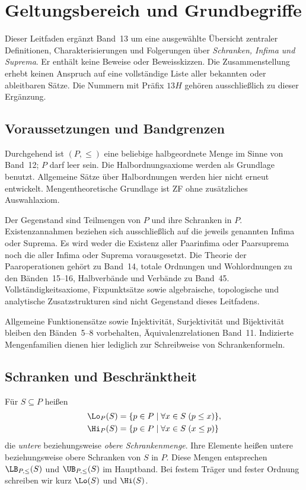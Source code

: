 \chapter{Geltungsbereich und Grundbegriffe}
\label{b13guide:ch:foundations}

Dieser Leitfaden ergänzt Band~13 um eine ausgewählte Übersicht
zentraler Definitionen, Charakterisierungen und Folgerungen über
\emph{Schranken, Infima und Suprema}. Er enthält keine Beweise
oder Beweisskizzen. Die Zusammenstellung erhebt keinen Anspruch
auf eine vollständige Liste aller bekannten oder ableitbaren Sätze.
Die Nummern mit Präfix $13H$ gehören ausschließlich zu dieser Ergänzung.

\section{Voraussetzungen und Bandgrenzen}

Durchgehend ist $(P,\leq)$ eine beliebige halbgeordnete Menge
im Sinne von Band~12; $P$ darf leer sein. Die Halbordnungsaxiome
werden als Grundlage benutzt. Allgemeine Sätze über Halbordnungen
werden hier nicht erneut entwickelt. Mengentheoretische Grundlage
ist ZF ohne zusätzliches Auswahlaxiom.

Der Gegenstand sind Teilmengen von $P$ und ihre Schranken in $P$.
Existenzannahmen beziehen sich ausschließlich auf die jeweils
genannten Infima oder Suprema. Es wird weder die Existenz aller
Paarinfima oder Paarsuprema noch die aller Infima oder Suprema
vorausgesetzt. Die Theorie der Paaroperationen gehört zu Band~14,
totale Ordnungen und Wohlordnungen zu den Bänden~15--16,
Halbverbände und Verbände zu Band~45. Vollständigkeitsaxiome,
Fixpunktsätze sowie algebraische, topologische und analytische
Zusatzstrukturen sind nicht Gegenstand dieses Leitfadens.

Allgemeine Funktionensätze sowie Injektivität, Surjektivität
und Bijektivität bleiben den Bänden~5--8 vorbehalten,
Äquivalenzrelationen Band~11. Indizierte Mengenfamilien dienen
hier lediglich zur Schreibweise von Schrankenformeln.

\section{Schranken und Beschränktheit}

\begin{definition}[Schrankenmengen]\label{b13guide:def:bounds}
Für $S\subseteq P$ heißen
\[
\begin{aligned}
 \Lo_P(S)&=\{p\in P\mid\forall x\in S\;(p\leq x)\},\\
 \Hi_P(S)&=\{p\in P\mid\forall x\in S\;(x\leq p)\}
\end{aligned}
\]
die \emph{untere} beziehungsweise \emph{obere Schrankenmenge}.
Ihre Elemente heißen untere beziehungsweise obere Schranken von $S$
in $P$. Diese Mengen entsprechen $\LB_{P,\leq}(S)$ und
$\UB_{P,\leq}(S)$ im Hauptband. Bei festem Träger und fester
Ordnung schreiben wir kurz $\Lo(S)$ und $\Hi(S)$.
\end{definition}

